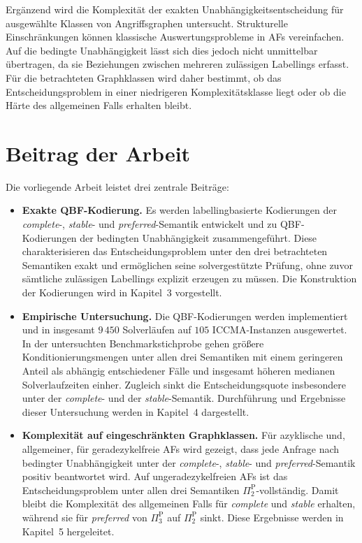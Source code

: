 Ergänzend wird die Komplexität der exakten Unabhängigkeitsentscheidung
für ausgewählte Klassen von Angriffsgraphen untersucht. Strukturelle
Einschränkungen können klassische Auswertungsprobleme in AFs vereinfachen.
Auf die bedingte Unabhängigkeit lässt sich dies jedoch nicht unmittelbar
übertragen, da sie Beziehungen zwischen mehreren zulässigen Labellings
erfasst. Für die betrachteten Graphklassen wird daher bestimmt, ob das
Entscheidungsproblem in einer niedrigeren Komplexitätsklasse liegt oder
ob die Härte des allgemeinen Falls erhalten bleibt.

\section{Beitrag der Arbeit}
\label{sec:einleitung-roadmap}

Die vorliegende Arbeit leistet drei zentrale Beiträge:

\begin{itemize}
    \item
    \textbf{Exakte QBF-Kodierung.}
    Es werden labellingbasierte Kodierungen der
    \emph{complete}-, \emph{stable}- und \emph{preferred}-Semantik
    entwickelt und zu QBF-Kodierungen der bedingten Unabhängigkeit
    zusammengeführt. Diese charakterisieren das Entscheidungsproblem
    unter den drei betrachteten Semantiken exakt und ermöglichen seine
    solvergestützte Prüfung, ohne zuvor sämtliche zulässigen Labellings
    explizit erzeugen zu müssen. Die Konstruktion der Kodierungen wird
    in Kapitel~3 vorgestellt.

    \item
    \textbf{Empirische Untersuchung.}
    Die QBF-Kodierungen werden implementiert und in insgesamt
    \(9\,450\) Solverläufen auf \(105\) ICCMA-Instanzen ausgewertet.
    In der untersuchten Benchmarkstichprobe gehen größere
    Konditionierungsmengen unter allen drei Semantiken mit einem
    geringeren Anteil als abhängig entschiedener Fälle und insgesamt
    höheren medianen Solverlaufzeiten einher. Zugleich sinkt die
    Entscheidungsquote insbesondere unter der \emph{complete}- und der
    \emph{stable}-Semantik. Durchführung und Ergebnisse dieser
    Untersuchung werden in Kapitel~4 dargestellt.

    \item
    \textbf{Komplexität auf eingeschränkten Graphklassen.}
    Für azyklische und, allgemeiner, für geradezykelfreie AFs wird
    gezeigt, dass jede Anfrage nach bedingter Unabhängigkeit unter der
    \emph{complete}-, \emph{stable}- und \emph{preferred}-Semantik
    positiv beantwortet wird. Auf ungeradezykelfreien AFs ist das
    Entscheidungsproblem unter allen drei Semantiken
    \(\Pi_2^{\mathrm{P}}\)-vollständig. Damit bleibt die Komplexität des
    allgemeinen Falls für \emph{complete} und \emph{stable} erhalten,
    während sie für \emph{preferred} von
    \(\Pi_3^{\mathrm{P}}\) auf \(\Pi_2^{\mathrm{P}}\) sinkt.
    Diese Ergebnisse werden in Kapitel~5 hergeleitet.
\end{itemize}
\fi
